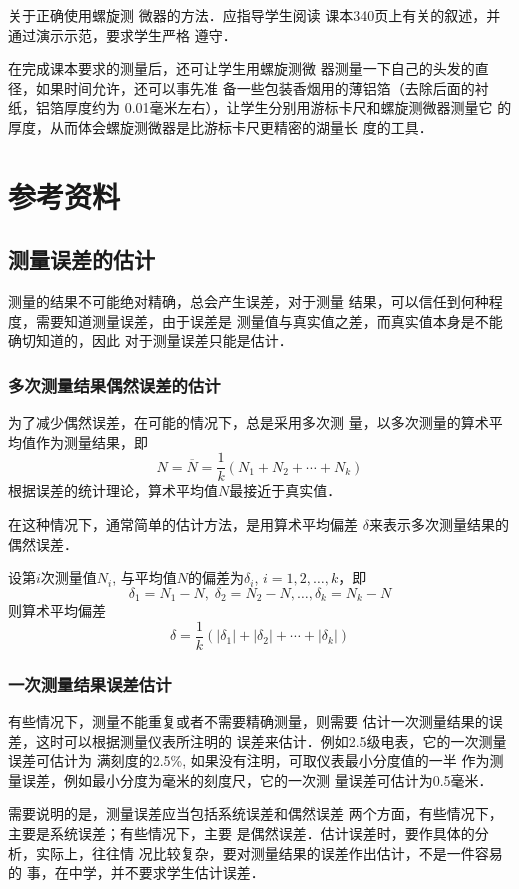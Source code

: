 关于正确使用螺旋测
微器的方法．应指导学生阅读
课本340页上有关的叙述，并通过演示示范，要求学生严格
遵守．

在完成课本要求的测量后，还可让学生用螺旋测微
器测量一下自己的头发的直径，如果时间允许，还可以事先准
备一些包装香烟用的薄铝箔（去除后面的衬纸，铝箔厚度约为
0.01毫米左右），让学生分别用游标卡尺和螺旋测微器测量它
的厚度，从而体会螺旋测微器是比游标卡尺更精密的湖量长
度的工具．

\section{参考资料}
\subsection{测量误差的估计}
测量的结果不可能绝对精确，总会产生误差，对于测量
结果，可以信任到何种程度，需要知道测量误差，由于误差是
测量值与真实值之差，而真实值本身是不能确切知道的，因此
对于测量误差只能是估计．

\subsubsection{多次测量结果偶然误差的估计}
为了减少偶然误差，在可能的情况下，总是采用多次测
量，以多次测量的算术平均值作为测量结果，即
\[N=\overline{N}=\frac{1}{k}(N_1+N_2+\cdots+N_k)\]
根据误差的统计理论，算术平均值$N$最接近于真实值．

在这种情况下，通常简单的估计方法，是用算术平均偏差
$\delta$来表示多次测量结果的偶然误差．

设第$i$次测量值$N_i$, 与平均值$N$的偏差为$\delta_i$, $i=1,2,\ldots,k$，即
\[\delta_1=N_1-N,\; \delta_2=N_2-N,\ldots,\delta_k=N_k-N\]
则算术平均偏差
\[\delta=\frac{1}{k}(|\delta_1|+|\delta_2|+\cdots+|\delta_k|)\]

\subsubsection{一次测量结果误差估计}
有些情况下，测量不能重复或者不需要精确测量，则需要
估计一次测量结果的误差，这时可以根据测量仪表所注明的
误差来估计．例如2.5级电表，它的一次测量误差可估计为
满刻度的2.5\%, 如果没有注明，可取仪表最小分度值的一半
作为测量误差，例如最小分度为毫米的刻度尺，它的一次测
量误差可估计为0.5毫米．

需要说明的是，测量误差应当包括系统误差和偶然误差
两个方面，有些情况下，主要是系统误差；有些情况下，主要
是偶然误差．估计误差时，要作具体的分析，实际上，往往情
况比较复杂，要对测量结果的误差作出估计，不是一件容易的
事，在中学，并不要求学生估计误差．


